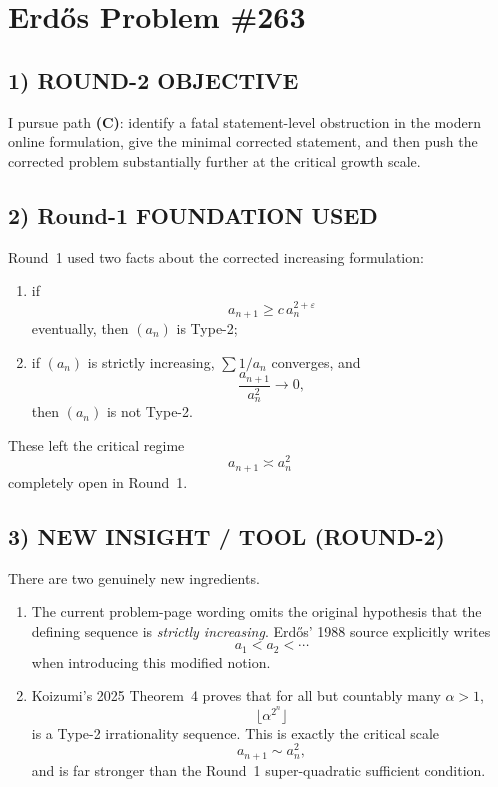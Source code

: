 
\section{Erd\H{o}s Problem \#263}

\subsection*{1) ROUND-2 OBJECTIVE}

I pursue path \textbf{(C)}: identify a fatal statement-level obstruction in the modern online formulation, give the minimal corrected statement, and then push the corrected problem substantially further at the critical growth scale.

\subsection*{2) Round-1 FOUNDATION USED}

Round~1 used two facts about the corrected increasing formulation:

\begin{enumerate}
\item if
\[
a_{n+1}\geq c\,a_n^{2+\varepsilon}
\]
eventually, then $(a_n)$ is Type-2;
\item if $(a_n)$ is strictly increasing, $\sum 1/a_n$ converges, and
\[
\frac{a_{n+1}}{a_n^2}\to 0,
\]
then $(a_n)$ is not Type-2.
\end{enumerate}

These left the critical regime
\[
a_{n+1}\asymp a_n^2
\]
completely open in Round~1.

\subsection*{3) NEW INSIGHT / TOOL (ROUND-2)}

There are two genuinely new ingredients.

\begin{enumerate}
\item The current problem-page wording omits the original hypothesis that the defining sequence is \emph{strictly increasing}.  Erd\H{o}s' 1988 source explicitly writes
\[
a_1<a_2<\cdots
\]
when introducing this modified notion.
\item Koizumi's 2025 Theorem~4 proves that for all but countably many $\alpha>1$,
\[
\lfloor \alpha^{2^n}\rfloor
\]
is a Type-2 irrationality sequence.  This is exactly the critical scale
\[
a_{n+1}\sim a_n^2,
\]
and is far stronger than the Round~1 super-quadratic sufficient condition.
\end{enumerate}

